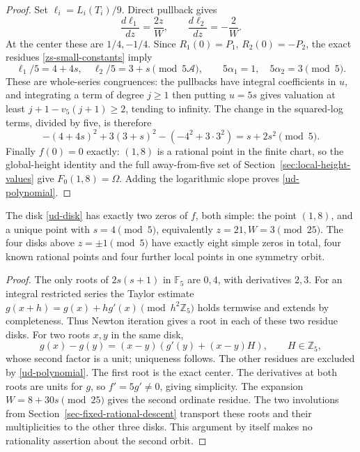 \begin{proof}
Set \(\ell_i=L_i(T_i)/9\). Direct pullback gives
\begin{equation}
 \frac{d\ell_1}{dz}=\frac{2z}{W},\qquad
 \frac{d\ell_2}{dz}=-\frac2W.
 \label{ud-pullbacks}
\end{equation}
At the center these are \(1/4,-1/4\). Since
\(R_1(0)=P_1\), \(R_2(0)=-P_2\), the exact residues
\eqref{zs-small-constants} imply
\begin{equation}
 \ell_1/5=4+4s,\quad \ell_2/5=3+s\pmod{5\mathcal A},
 \qquad 5\alpha_1=1,\quad5\alpha_2=3\pmod5.
 \label{ud-logarithm-digits}
\end{equation}
These are whole-series congruences: the pullbacks have integral
coefficients in \(u\), and integrating a term of degree \(j\ge1\)
then putting \(u=5s\) gives valuation at least
\(j+1-v_5(j+1)\ge2\), tending to infinity.
The change in the squared-log terms, divided by five, is therefore
\[
 -(4+4s)^2+3(3+s)^2-(-4^2+3\cdot3^2)=s+2s^2\pmod5.
\]
Finally \(f(0)=0\) exactly: \((1,8)\) is a rational point in the
finite chart, so the global-height identity and the full
away-from-five set of Section~\ref{sec:local-height-values} give
\(F_0(1,8)=\Omega\). Adding the logarithmic slope proves
\eqref{ud-polynomial}.
\end{proof}

\begin{theorem}
\label{ud-two-zeros}
The disk \eqref{ud-disk} has exactly two zeros of \(f\), both simple:
the point \((1,8)\), and a unique point with
\(s=4\pmod5\), equivalently \(z=21,W=3\pmod{25}\).
The four disks above \(z=\pm1\pmod5\) have exactly eight simple
zeros in total, four known rational points and four further local
points in one symmetry orbit.
\end{theorem}
\begin{proof}
The only roots of \(2s(s+1)\) in \(\mathbb F_5\) are \(0,4\),
with derivatives \(2,3\). For an integral restricted series the
Taylor estimate
\(g(x+h)=g(x)+hg'(x)\pmod{h^2\mathbb Z_5}\)
holds termwise and extends by completeness. Thus Newton iteration
gives a root in each of these two residue disks. For two roots
\(x,y\) in the same disk,
\[
 g(x)-g(y)=(x-y)(g'(y)+(x-y)H),\qquad H\in\mathbb Z_5,
\]
whose second factor is a unit; uniqueness follows. The other residues
are excluded by \eqref{ud-polynomial}. The first root is the exact
center. The derivatives at both roots are units for \(g\), so
\(f'=5g'\ne0\), giving simplicity. The expansion
\(W=8+30s\pmod{25}\) gives the second ordinate residue.
The two involutions from Section~\ref{sec-fixed-rational-descent}
transport these roots and their multiplicities to the other three
disks. This argument by itself makes no rationality assertion about
the second orbit.
\end{proof}

